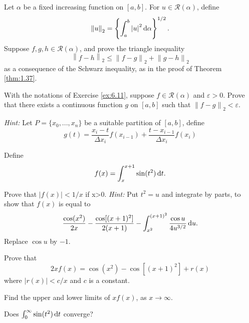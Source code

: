 \begin{myExercise}
    \label{ex:6.11}
    Let $\alpha$ be a fixed increasing function on $[a, b]$. 
    For $u \in \mathscr{R}(\alpha)$, define
    \begin{equation*}
        \left\| u \right\|_2 = \left\{ \int_a^b \left| u \right|^2 \d \alpha \right\}^{1/2} .
    \end{equation*}
    Suppose $f, g, h \in \mathscr{R}(\alpha)$, and prove the triangle inequality
    \begin{equation*}
        \left\| f-h \right\|_2 \leq
        \left\| f-g \right\|_2 +
        \left\| g-h \right\|_2 
    \end{equation*}
    as a consequence of the Schwarz inequality, as in the proof of Theorem \ref{thm:1.37}.
\end{myExercise}


\begin{myExercise}
    \label{ex:6.12}
    With the notations of Exercise \ref{ex:6.11}, 
    suppose $f \in \mathscr{R}(\alpha)$ and $\varepsilon > 0$. 
    Prove that there exists a continuous function $g$ on $[a, b]$ such that $\left\| f-g \right\|_2 < \varepsilon$.

    \emph{Hint:} Let $P = \{x_0,...,x_n\}$ be a suitable partition of $[a, b]$, define
    \begin{equation*}
        g(t) = 
        \frac{x_i-t}{\Delta x_i} f(x_{i-1}) +
        \frac{t-x_{i-1}}{\Delta x_i} f(x_{i})
    \end{equation*}
\end{myExercise}


\begin{myExercise}
    \label{ex:6.13}
    Define 
    \begin{equation*}
        f(x) = \int_{x}^{x+1} \sin (t^2) \d t.
    \end{equation*}
    \begin{asparaenum}[(a)]
        \item Prove that $\left| f(x) \right| < 1/x$ if x>0.
        \emph{Hint:} Put $t^2 = u$ and integrate by parts, to show that $f(x)$ is equal to 
        \begin{equation*}
            \frac{\cos(x^2)}{2x} - \frac{\cos [(x+1)^2]}{2(x+1)} - \int_{x^2}^{(x+1)^2}\frac{\cos u}{4 u^{3/2}} \d u.
        \end{equation*}
        Replace $\cos u$ by $-1$.
        \item Prove that 
        \begin{equation*}
            2xf(x) = \cos(x^2) - \cos [(x+1)^2] + r(x)
        \end{equation*}
        where $\left| r(x) \right| < c/x$ and $c$ is a constant.
        \item Find the upper and lower limits of $x f(x)$, as $x \rightarrow \infty$.
        \item Does $\int_{0}^{\infty} \sin (t^2) \d t$ converge?
    \end{asparaenum}
\end{myExercise}


